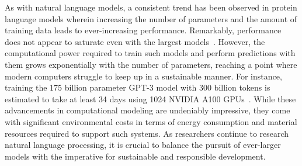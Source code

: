 As with natural language models, a consistent trend has been observed in protein language models wherein increasing the number of parameters and the amount of training data leads to ever-increasing performance. Remarkably, performance does not appear to saturate even with the largest models~\cite{Ofer}. However, the computational power required to train such models and perform predictions with them grows exponentially with the number of parameters, reaching a point where modern computers struggle to keep up in a sustainable manner. For instance, training the 175 billion parameter GPT-3 model with 300 billion tokens is estimated to take at least 34 days using 1024 NVIDIA A100 GPUs~\cite{gptrain}. While these advancements in computational modeling are undeniably impressive, they come with significant environmental costs in terms of energy consumption and material resources required to support such systems. As researchers continue to research natural language processing, it is crucial to balance the pursuit of ever-larger models with the imperative for sustainable and responsible development.
